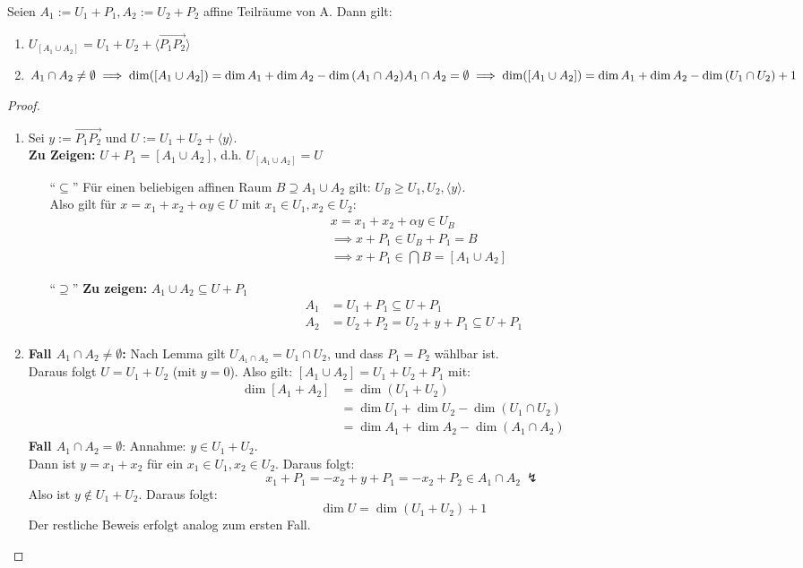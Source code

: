 \documentclass[parskip,a4paper,twoside,DIV15,BCOR12mm]{scrbook}
\begin{document}
\begin{theo}
Seien $A_1:=U_1+P_1,A_2:=U_2+P_2$ affine Teilräume von A. Dann gilt:
\begin{enumerate}
\item $U_{[A_1\cup A_2]}=U_1+U_2+\langle\overrightarrow{P_1P_2}\rangle$
\item $A_1\cap A_2\ne\emptyset \implies \dim([A_1\cup A_2])=\dim{A_1}+\dim{A_2}-\dim{(A_1\cap A_2)}\\
A_1\cap A_2=\emptyset \implies \dim([A_1\cup A_2])=\dim{A_1}+\dim{A_2}-\dim{(U_1\cap U_2)}+1$
\end{enumerate}
\end{theo}

\begin{proof}
\begin{enumerate}
\item Sei $y:=\overrightarrow{P_1P_2}$ und $U:=U_1+U_2+\langle y\rangle$.\\
\textbf{Zu Zeigen:} $U+P_1=[A_1\cup A_2]$, d.h. $U_{[A_1\cup A_2]}=U$
\begin{enumerate}
\item["`$\subseteq$"'] Für einen beliebigen affinen Raum $B\supseteq A_1\cup A_2$ gilt: $U_B\ge U_1,U_2,
\langle y\rangle$.\\
Also gilt für $x=x_1+x_2+\alpha y\in U$ mit $x_1\in U_1, x_2\in U_2$:
\begin{align*}
&x=x_1+x_2+\alpha y\in U_B\\
&\implies x+P_1\in U_B+P_1=B\\
&\implies x+P_1\in \bigcap B=[A_1\cup A_2]
\end{align*}
\item["`$\supseteq$"'] \textbf{Zu zeigen:} $A_1\cup A_2\subseteq U+P_1$\\
\begin{align*}
A_1&=U_1+P_1\subseteq U+P_1\\
A_2&=U_2+P_2=U_2+y+P_1\subseteq U+P_1
\end{align*}
\end{enumerate}
\item 
\textbf{Fall $A_1\cap A_2\ne\emptyset$:} Nach Lemma gilt $U_{A_1\cap A_2}=U_1\cap U_2$,
und dass $P_1=P_2$ wählbar ist.\\ 
Daraus folgt $U=U_1+U_2$ (mit $y=0$). Also gilt: $[A_1\cup A_2]=U_1+U_2+P_1$ mit:
\begin{align*}
\dim{[A_1+A_2]}&=\dim{(U_1+U_2)}\\
&=\dim{U_1}+\dim{U_2}-\dim{(U_1\cap U_2)}\\
&=\dim{A_1}+\dim{A_2}-\dim{(A_1\cap A_2)}
\end{align*}
\textbf{Fall $A_1\cap A_2=\emptyset$}: Annahme: $y\in U_1+U_2$.\\
Dann ist $y=x_1+x_2$ für ein $x_1\in U_1,x_2\in U_2$. Daraus folgt:
\[x_1+P_1 = -x_2+y+P_1=-x_2+P_2\in A_1\cap A_2\ \lightning\]
Also ist $y\notin U_1+U_2$. Daraus folgt:
\[\dim{U}=\dim{(U_1+U_2)}+1\]
Der restliche Beweis erfolgt analog zum ersten Fall.
\end{enumerate}
\end{proof}
\end{document}
